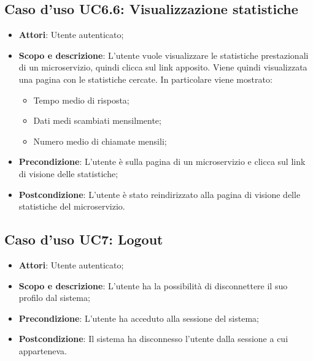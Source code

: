 \documentclass[12pt,a4paper,titlepage]{article}
\begin{document}
	\subsection{Caso d'uso UC6.6: Visualizzazione statistiche }
	\label{UC6.6}
	\begin{itemize}
		\item \textbf{Attori}: Utente autenticato;
		\item \textbf{Scopo e descrizione}: L'utente vuole visualizzare le statistiche prestazionali di un microservizio, quindi clicca sul link apposito. Viene quindi visualizzata una pagina con le statistiche cercate. In particolare viene mostrato:
		\begin{itemize}
			\item Tempo medio di risposta;
			\item Dati medi scambiati mensilmente;
			\item Numero medio di chiamate mensili;
		\end{itemize}
		\item \textbf{Precondizione}: L'utente è sulla pagina di un microservizio e clicca sul link di visione delle statistiche;
		\item \textbf{Postcondizione}: L'utente è stato reindirizzato alla pagina di visione delle statistiche del microservizio.
	\end{itemize}
	\subsection{Caso d'uso UC7: Logout}
	\label{UC7}
	\begin{itemize}
		\item \textbf{Attori}: Utente autenticato;
		\item \textbf{Scopo e descrizione}: L'utente ha la possibilità di disconnettere il suo profilo dal sistema;
		\item \textbf{Precondizione}: L'utente ha acceduto alla sessione del sistema;
		\item \textbf{Postcondizione}: Il sistema ha disconnesso l'utente dalla sessione a cui apparteneva.
	\end{itemize}
\end{document}
